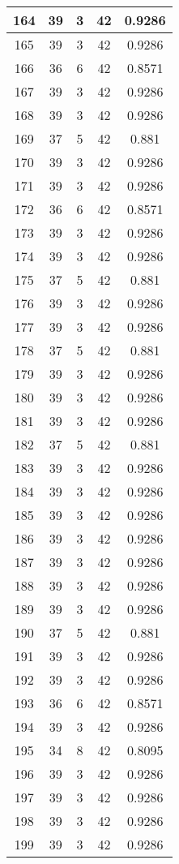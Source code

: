 \documentclass[letterpaper, 12pt]{article}
\begin{document}
\begin{longtable}{|c|c|c|c|c|}
\hline
164 & 39 & 3 & 42 & 0.9286 \\
\hline
165 & 39 & 3 & 42 & 0.9286 \\
\hline
166 & 36 & 6 & 42 & 0.8571 \\
\hline
167 & 39 & 3 & 42 & 0.9286 \\
\hline
168 & 39 & 3 & 42 & 0.9286 \\
\hline
169 & 37 & 5 & 42 & 0.881 \\
\hline
170 & 39 & 3 & 42 & 0.9286 \\
\hline
171 & 39 & 3 & 42 & 0.9286 \\
\hline
172 & 36 & 6 & 42 & 0.8571 \\
\hline
173 & 39 & 3 & 42 & 0.9286 \\
\hline
174 & 39 & 3 & 42 & 0.9286 \\
\hline
175 & 37 & 5 & 42 & 0.881 \\
\hline
176 & 39 & 3 & 42 & 0.9286 \\
\hline
177 & 39 & 3 & 42 & 0.9286 \\
\hline
178 & 37 & 5 & 42 & 0.881 \\
\hline
179 & 39 & 3 & 42 & 0.9286 \\
\hline
180 & 39 & 3 & 42 & 0.9286 \\
\hline
181 & 39 & 3 & 42 & 0.9286 \\
\hline
182 & 37 & 5 & 42 & 0.881 \\
\hline
183 & 39 & 3 & 42 & 0.9286 \\
\hline
184 & 39 & 3 & 42 & 0.9286 \\
\hline
185 & 39 & 3 & 42 & 0.9286 \\
\hline
186 & 39 & 3 & 42 & 0.9286 \\
\hline
187 & 39 & 3 & 42 & 0.9286 \\
\hline
188 & 39 & 3 & 42 & 0.9286 \\
\hline
189 & 39 & 3 & 42 & 0.9286 \\
\hline
190 & 37 & 5 & 42 & 0.881 \\
\hline
191 & 39 & 3 & 42 & 0.9286 \\
\hline
192 & 39 & 3 & 42 & 0.9286 \\
\hline
193 & 36 & 6 & 42 & 0.8571 \\
\hline
194 & 39 & 3 & 42 & 0.9286 \\
\hline
195 & 34 & 8 & 42 & 0.8095 \\
\hline
196 & 39 & 3 & 42 & 0.9286 \\
\hline
197 & 39 & 3 & 42 & 0.9286 \\
\hline
198 & 39 & 3 & 42 & 0.9286 \\
\hline
199 & 39 & 3 & 42 & 0.9286 \\
\hline
\end{longtable}
\end{document}
